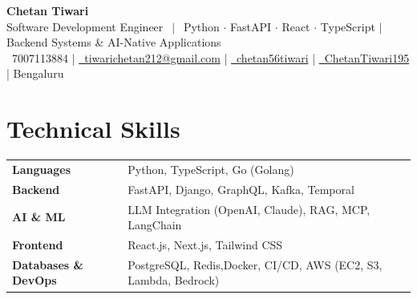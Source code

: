 \documentclass[letterpaper,11pt]{article}
\begin{document}
\begin{center}
  {\LARGE \textbf{Chetan Tiwari}}\\[2pt]
  {\small Software Development Engineer $\,\mid\,$ Python $\cdot$ FastAPI $\cdot$ React $\cdot$ TypeScript $\mid$ Backend Systems \& AI-Native Applications}\\[3pt]
  \faPhone*\ 7007113884 \enspace|\enspace
  \href{mailto:tiwarichetan212@gmail.com}{\faEnvelope\ tiwarichetan212@gmail.com} \enspace|\enspace
  \href{https://linkedin.com/in/chetan56tiwari}{\faLinkedin\ chetan56tiwari} \enspace|\enspace
  \href{https://github.com/ChetanTiwari195}{\faGithub\ ChetanTiwari195} \enspace|\enspace
  Bengaluru
\end{center}
\vspace{-4pt}


\section*{Technical Skills}
\vspace{2pt}
\small
\begin{tabular}{@{}p{ 4.1cm} p{\dimexpr\textwidth-4.1cm}@{}}
  \textbf{Languages}    & Python, TypeScript, Go (Golang) \\[2pt]
  \textbf{Backend}      & FastAPI, Django, GraphQL, Kafka, Temporal \\[2pt]
  \textbf{AI \& ML}     & LLM Integration (OpenAI, Claude), RAG, MCP, LangChain \\[2pt]
  \textbf{Frontend}     & React.js, Next.js, Tailwind CSS \\[2pt]
  \textbf{Databases \& DevOps}    & PostgreSQL, Redis,Docker, CI/CD, AWS (EC2, S3, Lambda, Bedrock) \\
\end{tabular}
\end{document}
